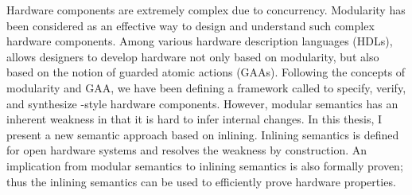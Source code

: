 % 
% 
%

Hardware components are extremely complex due to concurrency.
Modularity has been considered as an effective way to design and
understand such complex hardware components. Among various hardware
description languages (HDLs), \Bluespec{} allows designers to develop
hardware not only based on modularity, but also based on the notion of
guarded atomic actions (GAAs). Following the concepts of modularity
and GAA, we have been defining a framework called \Kami{} to specify,
verify, and synthesize \Bluespec{}-style hardware components. However,
modular semantics has an inherent weakness in that it is hard to infer
internal changes. In this thesis, I present a new semantic approach
based on inlining. Inlining semantics is defined for open hardware
systems and resolves the weakness by construction.  An implication
from modular semantics to inlining semantics is also formally proven;
thus the inlining semantics can be used to efficiently prove hardware
properties.


